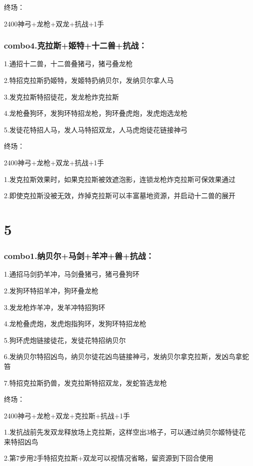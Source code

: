 \documentclass[
]{article}
\begin{document}
终场：

2400神弓+龙枪+双龙+抗战+1手

\hypertarget{combo4.ux514bux62c9ux65afux59ecux7279ux5341ux4e8cux517dux6297ux6218}{%
\subsubsection{combo4.克拉斯+姬特+十二兽+抗战：}\label{combo4.ux514bux62c9ux65afux59ecux7279ux5341ux4e8cux517dux6297ux6218}}

1.通招十二兽，十二兽叠猪弓，猪弓叠龙枪

2.特招克拉斯扔姬特，发姬特扔纳贝尔，发纳贝尔拿人马

3.发克拉斯特招徒花，发龙枪炸克拉斯

4.龙枪叠狗环，发狗环特招龙枪，狗环叠虎炮，发虎炮选龙枪

5.发徒花特招人马，发人马特招双龙，人马虎炮徒花链接神弓

终场：

2400神弓+龙枪+双龙+抗战+1手

1.发克拉斯效果时，如果克拉斯被效遮泡影，连锁龙枪炸克拉斯可保效果通过

2.即使克拉斯没被无效，炸掉克拉斯可以丰富墓地资源，并启动十二兽的展开

\hypertarget{section-4}{%
\section{5}\label{section-4}}

\hypertarget{combo1.ux7eb3ux8d1dux5c14ux9a6cux5251ux7f8aux51b2ux517dux6297ux6218}{%
\subsubsection{combo1.纳贝尔+马剑+羊冲+兽+抗战：}\label{combo1.ux7eb3ux8d1dux5c14ux9a6cux5251ux7f8aux51b2ux517dux6297ux6218}}

1.通招马剑扔羊冲，马剑叠猪弓，猪弓叠狗环

2.发狗环特招羊冲，狗环叠龙枪

3.发龙枪炸羊冲，发羊冲特招狗环

4.龙枪叠虎炮，发虎炮指狗环，发狗环特招龙枪

5.狗环虎炮链接徒花，发徒花特招纳贝尔

6.发纳贝尔特招凶鸟，纳贝尔徒花凶鸟链接神弓，发纳贝尔拿克拉斯，发凶鸟拿蛇笞

7.特招克拉斯扔兽，发克拉斯特招双龙，发蛇笞选龙枪

终场：

2400神弓+龙枪+双龙+克拉斯+抗战+1手

1.发抗战前先发双龙释放场上克拉斯，这样空出3格子，可以通过纳贝尔姬特徒花来特招凶鸟

2.第7步用2手特招克拉斯+双龙可以视情况省略，留资源到下回合使用
\end{document}
